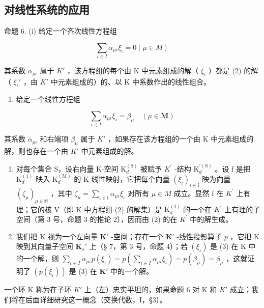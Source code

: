 \subsection{对线性系统的应用}

命题 6. (i) 给定一个齐次线性方程组

\[
\sum_ {\iota \in I} \alpha_ {\mu \iota} \xi_ {\iota} = 0 (\mu \in M)\tag{2}
\]

其系数 \(\alpha_{\mu \iota}\) 属于 \(K'\) ，该方程组的每个由 K 中元素组成的解（ \(\xi_{\iota}\) ）都是 (2) 的解（ \(\xi_{\iota}'\) ，由 \(K'\) 中元素组成的）的、以 K 中系数作出的线性组合。

\begin{enumerate}
\def\labelenumi{(\roman{enumi})}
\setcounter{enumi}{1}
\tightlist
\item
  给定一个线性方程组
\end{enumerate}

\[
\sum_ {\iota \in I} \alpha_ {\mu \iota} \xi_ {\iota} = \beta_ {\mu} \quad (\mu \in \mathbf {M})\tag{3}
\]

其系数 \(\alpha_{\mu \iota}\) 和右端项 \(\beta_{\mu}\) 属于 \(K'\) ，如果存在该方程组的一个由 K 中元素组成的解，则也存在一个由 \(K'\) 中元素组成的解。

\begin{enumerate}
\def\labelenumi{(\roman{enumi})}
\item
  对每个集合 S，设右向量 K-空间 \(\mathrm{K}_{d}^{(\mathrm{S})}\) 被赋予 \(K^{\prime}\) -结构 \(\mathrm{K}_{d}^{\prime(\mathrm{S})}\) 。设 f 是把 \(\mathrm{K}_{d}^{(1)}\) 映入 \(\mathrm{K}_{d}^{(\mathrm{M})}\) 的 K-线性映射，它把每个向量 \((\xi_{\iota})_{\iota\in\mathbb{I}}\) 映为向量 \((\zeta_{\mu})_{\mu\in\mathbb{M}}\) ，其中 \(\zeta_{\mu}=\sum_{\iota\in\mathbb{I}}\alpha_{\mu\iota}\xi_{\iota}\) 对所有 \(\mu\in M\) 成立。显然 f 在 \(K^{\prime}\) 上有理；它的核 V（即 K 中方程组 (2) 的解集）是 \(\mathrm{K}_{d}^{(\mathrm{I})}\) 的一个在 \(K^{\prime}\) 上有理的子空间（第 3 号，命题 3 的推论 2），因而由 (2) 的在 \(K^{\prime}\) 中的解生成。
\item
  我们把 K 视为一个左向量 \(\mathbf{K}'\) -空间；存在一个 \(\mathbf{K}'\) -线性投影算子 \(p\) ，它把 K 映到其向量子空间 \(\mathbf{K}_s'\) 上（§ 7，第 3 号，命题 4）；若 \((\xi_{\iota})\) 是 (3) 在 K 中的一个解，则 \(\sum_{\iota \in I} \alpha_{\mu \iota} p(\xi_{\iota}) = p\left(\sum_{\iota \in I} \alpha_{\mu \iota} \xi_{\iota}\right) = p(\beta_\mu) = \beta_\mu\) ，这就证明了 \((p(\xi_{\iota}))\) 是 (3) 在 \(\mathbf{K}'\) 中的一个解。
\end{enumerate}

一个环 K 称为在子环 \(K'\) 上（左）忠实平坦的，如果命题 6 对 K 和 \(K'\) 成立；我们将在后面详细研究这一概念（交换代数，I，§3）。

